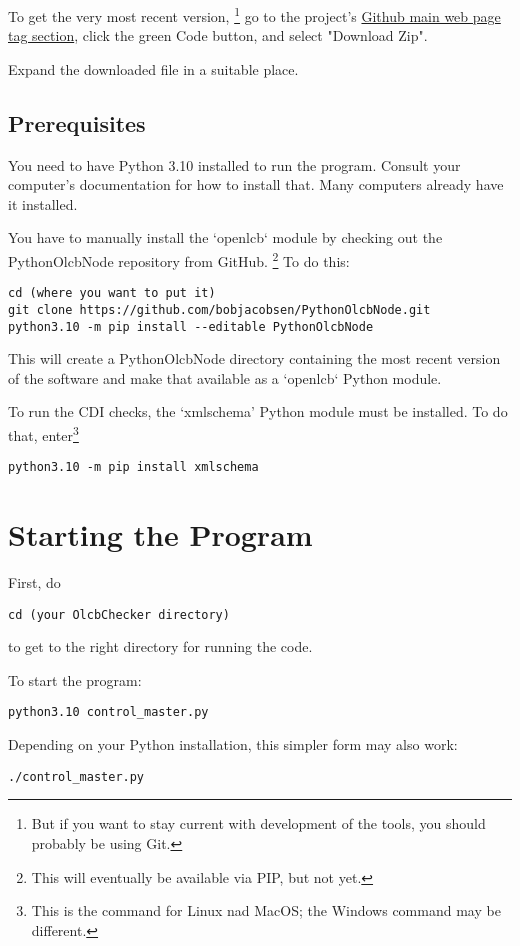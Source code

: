 To get the very most recent version,
\footnote{But if you want to stay current with development of the tools, you should probably be using Git.}
go to the project's
\href{https://github.com/bobjacobsen/OlcbChecker}{Github main web page tag section},
click the green Code button, and select "Download Zip".

Expand the downloaded file in a suitable place.

\subsection{Prerequisites}

You need to have Python 3.10 installed to run the program. Consult your
computer's documentation for how to install that.  Many computers already
have it installed.

You have to manually install the `openlcb` module by checking out the 
PythonOlcbNode repository from GitHub.
\footnote{This will eventually be available via PIP, but not yet.}
To do this:
\begin{verbatim}
cd (where you want to put it)
git clone https://github.com/bobjacobsen/PythonOlcbNode.git
python3.10 -m pip install --editable PythonOlcbNode
\end{verbatim}
This will create a PythonOlcbNode directory containing the most recent version of the software
and make that available as a `openlcb` Python module.

To run the CDI checks, the `xmlschema' Python module must be installed. To do that, 
enter\footnote{This is the command for Linux nad MacOS; the Windows command may be different.}

\begin{verbatim}
python3.10 -m pip install xmlschema
\end{verbatim}

\section{Starting the Program}

First, do
\begin{verbatim}
cd (your OlcbChecker directory)
\end{verbatim}
to get to the right directory for running the code. 

To start the program:
\begin{verbatim}
python3.10 control_master.py
\end{verbatim}

Depending on your Python installation, this simpler form may also work:
\begin{verbatim}
./control_master.py
\end{verbatim}


